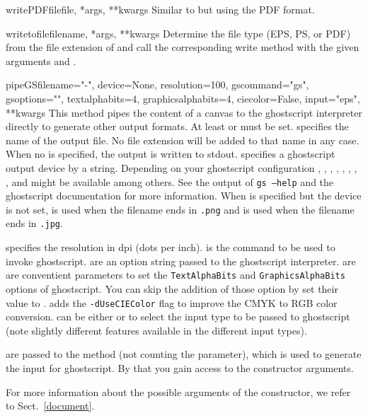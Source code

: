 \begin{methoddesc}{writePDFfile}{file, *args, **kwargs}
  Similar to  but using the PDF format.
\end{methoddesc}

\begin{methoddesc}{writetofile}{filename, *args, **kwargs}
  Determine the file type (EPS, PS, or PDF) from the file extension
  of  and call the corresponding write method with
  the given arguments  and .
\end{methoddesc}

\begin{methoddesc}{pipeGS}{filename="-", device=None, resolution=100,
                           gscommand="gs", gsoptions="",
                           textalphabits=4, graphicsalphabits=4,
                           ciecolor=False, input="eps", **kwargs}
  This method pipes the content of a canvas to the ghostscript
  interpreter directly to generate other output formats. At least
   or  must be set.  specifies
  the name of the output file. No file extension will be added to that
  name in any case. When no  is specified, the output is
  written to stdout.  specifies a ghostscript output
  device by a string. Depending on your ghostscript configuration
  , , , ,
  , , ,
  , and  might be available among
  others. See the output of \texttt{gs --help} and the ghostscript
  documentation for more information. When  is specified
  but the device is not set,  is used when the filename
  ends in \texttt{.png} and  is used when the filename
  ends in \texttt{.jpg}.

   specifies the resolution in dpi (dots per inch).
   is the command to be used to invoke ghostscript.
   are an option string passed to the ghostscript
  interpreter.  are  are
  conventient parameters to set the \texttt{TextAlphaBits} and
  \texttt{GraphicsAlphaBits} options of ghostscript. You can skip
  the addition of those option by set their value to .
   adds the \texttt{-dUseCIEColor} flag to improve
  the CMYK to RGB color conversion.  can be either
   or  to select the input type to be passed
  to ghostscript (note slightly different features available in the
  different input types).

   are passed to the  method (not
  counting the  parameter), which is used to generate the
  input for ghostscript. By that you gain access to the
   constructor arguments.
\end{methoddesc}

For more information about the possible arguments of the
 constructor, we refer to Sect.~\ref{document}.

